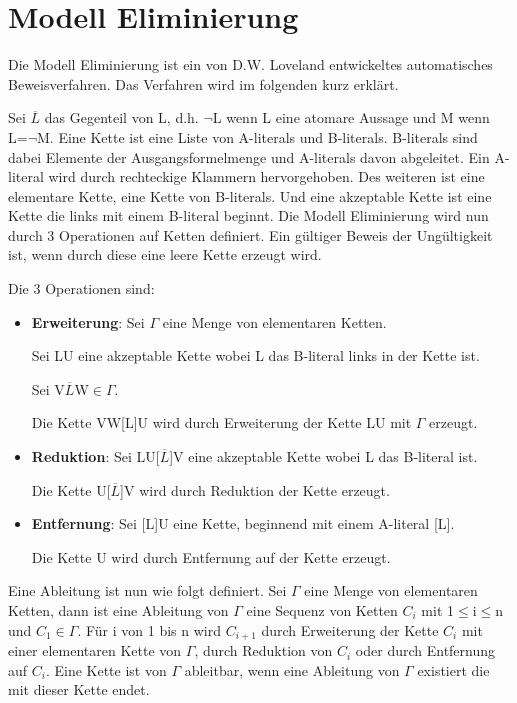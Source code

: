 \section{Modell Eliminierung}
Die Modell Eliminierung ist ein von D.W. Loveland entwickeltes automatisches Beweisverfahren. Das Verfahren wird im folgenden kurz erklärt.

Sei $\overline{L}$ das Gegenteil von L, d.h. $\neg$L wenn L eine atomare Aussage und M wenn L=$\neg$M. Eine Kette ist eine Liste von A-literals und B-literals. B-literals sind dabei Elemente der Ausgangsformelmenge und A-literals davon abgeleitet. Ein A-literal wird durch rechteckige Klammern hervorgehoben. Des weiteren ist eine elementare Kette, eine Kette von B-literals. Und eine akzeptable Kette ist eine Kette die links mit einem B-literal beginnt. Die Modell Eliminierung wird nun durch 3 Operationen auf Ketten definiert. Ein gültiger Beweis der Ungültigkeit ist, wenn durch diese eine leere Kette erzeugt wird. \cite{model_elimination}

Die 3 Operationen sind:
\begin{itemize}
\item \textbf{Erweiterung}: Sei $\Gamma$ eine Menge von elementaren Ketten.

Sei LU eine akzeptable Kette wobei L das B-literal links in der Kette ist.

Sei V$\overline{L}$W$\in \Gamma$.

Die Kette VW[L]U wird durch Erweiterung der Kette LU mit $\Gamma$ erzeugt.

\item \textbf{Reduktion}: Sei LU[$\overline{L}$]V eine akzeptable Kette wobei L das B-literal ist.

Die Kette U[$\overline{L}$]V wird durch Reduktion der Kette erzeugt.

\item \textbf{Entfernung}: Sei [L]U eine Kette, beginnend mit einem A-literal [L].

Die Kette U wird durch Entfernung auf der Kette erzeugt.
\end{itemize}

Eine Ableitung ist nun wie folgt definiert. Sei $\Gamma$ eine Menge von elementaren Ketten, dann ist eine Ableitung von $\Gamma$ eine Sequenz von Ketten $C_{i}$ mit 1$\leq$i$\leq$n und $C_{1}\in \Gamma$. Für i von 1 bis n wird $C_{i+1}$ durch Erweiterung der Kette $C_{i}$ mit einer elementaren Kette von $\Gamma$, durch Reduktion von $C_{i}$ oder durch Entfernung auf $C_{i}$. Eine Kette ist von $\Gamma$ ableitbar, wenn eine Ableitung von $\Gamma$ existiert die mit dieser Kette endet. \cite{model_elimination}

